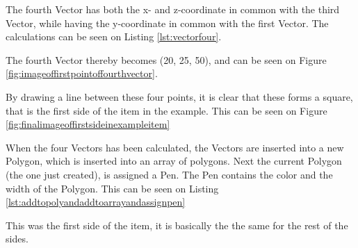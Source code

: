 The fourth Vector has both the x- and z-coordinate in common with the third Vector, while having the y-coordinate in common with the first Vector. The calculations can be seen on Listing \ref{lst:vectorfour}.


The fourth Vector thereby becomes (20, 25, 50), and can be seen on Figure \ref{fig:imageoffirstpointoffourthvector}.


By drawing a line between these four points, it is clear that these forms a square, that is the first side of the item in the example. This can be seen on Figure \ref{fig:finalimageoffirstsideinexampleitem}

When the four Vectors has been calculated, the Vectors are inserted into a new Polygon, which is inserted into an array of polygons.  Next the current Polygon (the one just created), is assigned a Pen. The Pen contains the color and the width of the Polygon. This can be seen on Listing \ref{lst:addtopolyandaddtoarrayandassignpen}


This was the first side of the item, it is basically the the same for the rest of the sides. 

